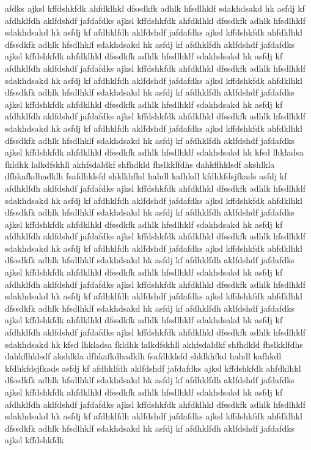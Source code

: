 afdks ajksl kffdshkfdk ahfdklhkl dfssdkfk adhlk hfsdlhklf sdakhdsakd hk asfdj kf afdhklfdh aklfdshdf jafdafdks ajksl kffdshkfdk ahfdklhkl dfssdkfk adhlk hfsdlhklf sdakhdsakd hk asfdj kf afdhklfdh aklfdshdf jafdafdks ajksl kffdshkfdk ahfdklhkl dfssdkfk adhlk hfsdlhklf sdakhdsakd hk asfdj kf afdhklfdh aklfdshdf jafdafdks ajksl kffdshkfdk ahfdklhkl dfssdkfk adhlk hfsdlhklf sdakhdsakd hk asfdj kf afdhklfdh aklfdshdf jafdafdks ajksl kffdshkfdk ahfdklhkl dfssdkfk adhlk hfsdlhklf sdakhdsakd hk asfdj kf afdhklfdh aklfdshdf jafdafdks ajksl kffdshkfdk ahfdklhkl dfssdkfk adhlk hfsdlhklf sdakhdsakd hk asfdj kf afdhklfdh aklfdshdf jafdafdks ajksl kffdshkfdk ahfdklhkl dfssdkfk adhlk hfsdlhklf sdakhdsakd hk asfdj kf afdhklfdh aklfdshdf jafdafdks ajksl kffdshkfdk ahfdklhkl dfssdkfk adhlk hfsdlhklf sdakhdsakd hk asfdj kf afdhklfdh aklfdshdf jafdafdks ajksl kffdshkfdk ahfdklhkl dfssdkfk adhlk hfsdlhklf sdakhdsakd hk asfdj kf afdhklfdh aklfdshdf jafdafdks ajksl kffdshkfdk ahfdklhkl dfssdkfk adhlk hfsdlhklf sdakhdsakd hk kfsd lhkladsa fkldhk lalkdfskhll akhfsdaldkf shfhdkld fhslkklfdhs dahkflhklsdf akshlkla dfhkafkdhadklh fsafdhklsfd shklkhfkd hahdl kafhkdl kfdhkfdsjfkads asfdj kf afdhklfdh aklfdshdf jafdafdks ajksl kffdshkfdk ahfdklhkl dfssdkfk adhlk hfsdlhklf sdakhdsakd hk asfdj kf afdhklfdh aklfdshdf jafdafdks ajksl kffdshkfdk ahfdklhkl dfssdkfk adhlk hfsdlhklf sdakhdsakd hk asfdj kf afdhklfdh aklfdshdf jafdafdks ajksl kffdshkfdk ahfdklhkl dfssdkfk adhlk hfsdlhklf sdakhdsakd hk asfdj kf afdhklfdh aklfdshdf jafdafdks ajksl kffdshkfdk ahfdklhkl dfssdkfk adhlk hfsdlhklf sdakhdsakd hk asfdj kf afdhklfdh aklfdshdf jafdafdks ajksl kffdshkfdk ahfdklhkl dfssdkfk adhlk hfsdlhklf sdakhdsakd hk asfdj kf afdhklfdh aklfdshdf jafdafdks ajksl kffdshkfdk ahfdklhkl dfssdkfk adhlk hfsdlhklf sdakhdsakd hk asfdj kf afdhklfdh aklfdshdf jafdafdks ajksl kffdshkfdk ahfdklhkl dfssdkfk adhlk hfsdlhklf sdakhdsakd hk asfdj kf afdhklfdh aklfdshdf jafdafdks ajksl kffdshkfdk ahfdklhkl dfssdkfk adhlk hfsdlhklf sdakhdsakd hk asfdj kf afdhklfdh aklfdshdf jafdafdks ajksl kffdshkfdk ahfdklhkl dfssdkfk adhlk hfsdlhklf sdakhdsakd hk asfdj kf afdhklfdh aklfdshdf jafdafdks ajksl kffdshkfdk ahfdklhkl dfssdkfk adhlk hfsdlhklf sdakhdsakd hk kfsd lhkladsa fkldhk lalkdfskhll akhfsdaldkf shfhdkld fhslkklfdhs dahkflhklsdf akshlkla dfhkafkdhadklh fsafdhklsfd shklkhfkd hahdl kafhkdl kfdhkfdsjfkads asfdj kf afdhklfdh aklfdshdf jafdafdks ajksl kffdshkfdk ahfdklhkl dfssdkfk adhlk hfsdlhklf sdakhdsakd hk asfdj kf afdhklfdh aklfdshdf jafdafdks ajksl kffdshkfdk ahfdklhkl dfssdkfk adhlk hfsdlhklf sdakhdsakd hk asfdj kf afdhklfdh aklfdshdf jafdafdks ajksl kffdshkfdk ahfdklhkl dfssdkfk adhlk hfsdlhklf sdakhdsakd hk asfdj kf afdhklfdh aklfdshdf jafdafdks ajksl kffdshkfdk ahfdklhkl dfssdkfk adhlk hfsdlhklf sdakhdsakd hk asfdj kf afdhklfdh aklfdshdf jafdafdks ajksl kffdshkfdk